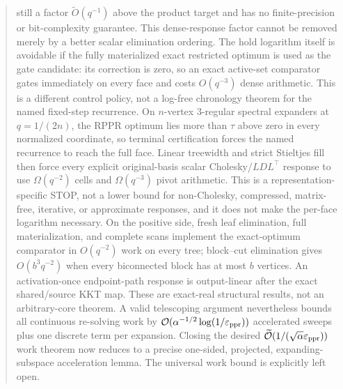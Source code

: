 \documentclass[11pt]{article}
\begin{document}
\begin{abstract}
still a factor $\widetilde O(q^{-1})$ above the product target and has no
finite-precision or bit-complexity guarantee.  This dense-response factor
cannot be removed merely by a better scalar elimination ordering.  The hold
logarithm itself is avoidable if the fully materialized exact restricted
optimum is used as the gate candidate: its correction is zero, so an exact
active-set comparator gates immediately on every face and costs
$O(q^{-3})$ dense arithmetic.  This is a different control policy, not a
log-free chronology theorem for the named fixed-step recurrence.  On
$n$-vertex $3$-regular spectral expanders at $q=1/(2n)$, the RPPR optimum lies more than
$\tau$ above zero in every normalized coordinate, so terminal certification
forces the named recurrence to reach the full face.  Linear treewidth and
strict Stieltjes fill then force every explicit original-basis scalar
Cholesky/$LDL^\top$ response to use $\Omega(q^{-2})$ cells and
$\Omega(q^{-3})$ pivot arithmetic.  This is a representation-specific STOP,
not a lower bound for non-Cholesky, compressed, matrix-free, iterative, or
approximate responses, and it does not make the per-face logarithm
necessary.  On the positive side, fresh leaf elimination, full
materialization, and complete scans implement the exact-optimum comparator in
$O(q^{-2})$ work on every tree; block--cut elimination gives
$O(b^3q^{-2})$ when every biconnected block has at most $b$ vertices.  An
activation-once endpoint-path response is output-linear after the exact
shared/source KKT map.  These are exact-real structural results, not an
arbitrary-core theorem.  A valid telescoping
argument nevertheless bounds all
continuous re-solving work by
$\bigO(\alpha^{-1/2}\log(1/\epsppr))$ accelerated sweeps plus one discrete
term per expansion.  Closing the desired
$\softO(1/(\sqrt\alpha\epsppr))$ work theorem now reduces to a precise
one-sided, projected, expanding-subspace acceleration lemma.  The universal
work bound is explicitly left open.
\end{abstract}

\tableofcontents












\end{document}
